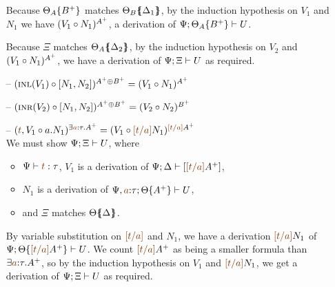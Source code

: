 \begin{itemize}

  Because ${\Theta_A}\{{B^+}\}$ matches ${\Theta_B}\mbox{$\{\hspace{-4pt}\{$}{\Delta_1}\mbox{$\}\hspace{-4pt}\}$}$,
  by the induction hypothesis on $V_1$ and $N_1$ we have
  $({V_1} \circ {N_1})^{A^+}$, a derivation of 
  ${\Psi};{{\Theta_A}\{{B^+}\}} \vdash {U} \mathstrut$.

  Because $\Xi$ matches ${\Theta_A}\mbox{$\{\hspace{-4pt}\{$}{\Delta_2}\mbox{$\}\hspace{-4pt}\}$}$, by the induction
  hypothesis on $V_2$ and $({V_1} \circ {N_1})^{A^+}$, we have a derivation
  of ${\Psi};{\Xi} \vdash {U} \mathstrut$ as required. \smallskip

\item[--] $({\textsc{inl}({V_1})} \circ {[{N_1},{N_2}]})^{A^+ \oplus B^+} 
           = ({V_1} \circ {N_1})^{A^+}$

\item[--] $({\textsc{inr}({V_2})} \circ {[{N_1},{N_2}]})^{A^+ \oplus B^+} 
           = ({V_2} \circ {N_2})^{B^+}$

\item[--] $(\subst{\texistsr{\lf{t}}{V_1}}{\texistsl{a}{N_1}})^{\exists \lf{a}{:}\tau.A^+}
           = (\subst{V_1}{\lf{[t/a]}N_1})^{\lf{[t/a]}A^+}$ \smallskip\\
  We must show ${\Psi};{\Xi} \vdash {U} \mathstrut$, where
  \begin{itemize}
  \item $\Psi \vdash \lf{t} : \tau$, $V_1$ is a derivation of 
     $\foc{\Psi}{\Delta}{[\lf{[t/a]}A^+]}$,
  \item 
     $N_1$ is a derivation of 
     $\foc{\Psi, \lf{a}{:}\tau}{\tackon{\Theta}{A^+}}{U}$,
  \item and $\Xi$ matches ${\Theta}\mbox{$\{\hspace{-4pt}\{$}{\Delta}\mbox{$\}\hspace{-4pt}\}$}$.
  \end{itemize}
  By variable
  substitution on $\lf{[t/a]}$ and $N_1$, we have a derivation $\lf{[t/a]}N_1$ of
  $\foc{\Psi}{\tackon{\Theta}{\lf{[t/a]}A^+}}{U}$.  We count $\lf{[t/a]}A^+$ as
  being a smaller formula than $\exists \lf{a}{:}\tau.A^+$, so by the
  induction hypothesis on $V_1$ and $\lf{[t/a]}N_1$, we get a derivation of
  ${\Psi};{\Xi} \vdash {U} \mathstrut$ as required. \smallskip


\end{itemize}
